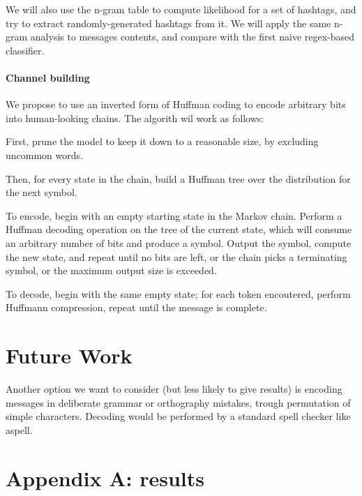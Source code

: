 \documentclass[a4paper,11pt]{article}
\begin{document}
We will also use the n-gram table to compute likelihood for a set of hashtags, and try to extract randomly-generated hashtags from it. We will apply the same n-gram analysis to messages contents, and compare with the first naive regex-based classifier.

\appendix

\paragraph{Channel building}

We propose to use an inverted form of Huffman coding to encode arbitrary bits into human-looking chains. The algorith wil work as follows:

First, prune the model to keep it down to a reasonable size, by excluding uncommon words.

Then, for every state in the chain, build a Huffman tree over the distribution for the next symbol.

To encode, begin with an empty starting state in the Markov chain. Perform a Huffman decoding operation on the tree of the current state, which will consume an arbitrary number of bits and produce a symbol. Output the symbol, compute the new state, and repeat until no bits are left, or the chain picks a terminating symbol, or the maximum output size is exceeded.

To decode, begin with the same empty state; for each token encoutered, perform Huffmann compression, repeat until the message is complete.

\section{Future Work}

Another option we want to consider (but less likely to give results) is encoding messages in deliberate grammar or orthography mistakes, trough permutation of simple characters. Decoding would be performed by a standard spell checker like aspell.



\section{Appendix A: results}
\end{document}

